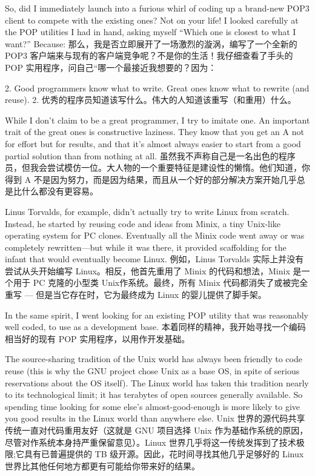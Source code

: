 \documentclass[a4paper,12pt,UTF8,twoside]{ctexbook}
\begin{document}
So, did I immediately launch into a furious whirl of coding up a brand-new POP3 client to compete with the existing ones? Not on your life! I looked carefully at the POP utilities I had in hand, asking myself ``Which one is closest to what I want?'' Because:
那么，我是否立即展开了一场激烈的漩涡，编写了一个全新的 POP3 客户端来与现有的客户端竞争呢？不是你的生活！我仔细查看了手头的 POP 实用程序，问自己“哪一个最接近我想要的？因为：

2. Good programmers know what to write. Great ones know what to rewrite (and reuse).
2. 优秀的程序员知道该写什么。伟大的人知道该重写（和重用）什么。

While I don't claim to be a great programmer, I try to imitate one. An important trait of the great ones is constructive laziness. They know that you get an A not for effort but for results, and that it's almost always easier to start from a good partial solution than from nothing at all.
虽然我不声称自己是一名出色的程序员，但我会尝试模仿一位。大人物的一个重要特征是建设性的懒惰。他们知道，你得到 A 不是因为努力，而是因为结果，而且从一个好的部分解决方案开始几乎总是比什么都没有更容易。

Linus Torvalds, for example, didn't actually try to write Linux from scratch. Instead, he started by reusing code and ideas from Minix, a tiny Unix-like operating system for PC clones. Eventually all the Minix code went away or was completely rewritten—but while it was there, it provided scaffolding for the infant that would eventually become Linux.
例如，Linus Torvalds 实际上并没有尝试从头开始编写 Linux。相反，他首先重用了 Minix 的代码和想法，Minix 是一个用于 PC 克隆的小型类 Unix作系统。最终，所有 Minix 代码都消失了或被完全重写 — 但是当它存在时，它为最终成为 Linux 的婴儿提供了脚手架。

In the same spirit, I went looking for an existing POP utility that was reasonably well coded, to use as a development base.
本着同样的精神，我开始寻找一个编码相当好的现有 POP 实用程序，以用作开发基础。

The source-sharing tradition of the Unix world has always been friendly to code reuse (this is why the GNU project chose Unix as a base OS, in spite of serious reservations about the OS itself). The Linux world has taken this tradition nearly to its technological limit; it has terabytes of open sources generally available. So spending time looking for some else's almost-good-enough is more likely to give you good results in the Linux world than anywhere else.
Unix 世界的源代码共享传统一直对代码重用友好（这就是 GNU 项目选择 Unix 作为基础作系统的原因，尽管对作系统本身持严重保留意见）。Linux 世界几乎将这一传统发挥到了技术极限;它具有已普遍提供的 TB 级开源。因此，花时间寻找其他几乎足够好的 Linux 世界比其他任何地方都更有可能给你带来好的结果。
\end{document}

